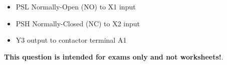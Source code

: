 \begin{itemize}
\item{} PSL Normally-Open (NO) to X1 input
\item{} PSH Normally-Closed (NC) to X2 input
\item{} Y3 output to contactor terminal A1
\end{itemize}







{\bf This question is intended for exams only and not worksheets!}.



